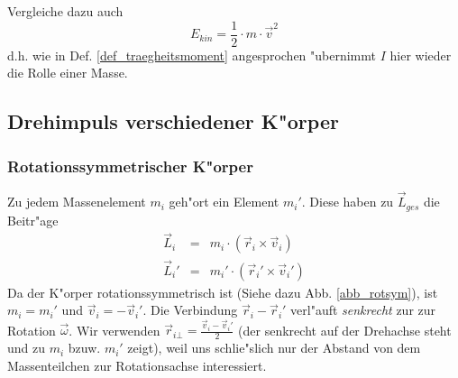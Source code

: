 Vergleiche dazu auch 
$$
E_{kin} = \frac{1}{2} \cdot m \cdot \vec v^2
$$
d.h. wie in Def. \ref{def_traegheitsmoment} angesprochen "ubernimmt $I$
hier wieder die Rolle einer Masse.











\subsection{Drehimpuls verschiedener K"orper}
\label{kap_drehimpuls-verschiedener-korper}



\subsubsection{Rotationssymmetrischer K"orper}
\label{kap_rotationssymmetrischer-korper}

Zu jedem Massenelement $m_i$ geh"ort ein Element $m_i'$. Diese haben zu
$\vec L_{ges}$ die Beitr"age
\begin{eqnarray}
   \label{eq:43}
   \vec L_i &=& m_i \cdot (\vec r_i \times \vec v_i)\\
\nonumber
   \vec L_i' &=& m_i' \cdot (\vec r_i' \times \vec v_i')
\end{eqnarray}
Da der K"orper rotationssymmetrisch ist (Siehe dazu Abb. \ref{abb_rotsym}), ist
$m_i = m_i'$ und $\vec v_i
= - \vec v_i'$. Die Verbindung $\vec r_i - \vec r_i'$ verl"auft
\emph{senkrecht} zur zur Rotation $\vec \omega$. Wir verwenden
$\vec r_{i\bot} = \frac{\vec v_i
 - \vec v_i'}{2}$ (der senkrecht auf der Drehachse steht und zu $m_i$
bzuw. $m_i'$ zeigt), weil uns schlie"slich nur der Abstand von dem
Massenteilchen zur Rotationsachse interessiert.

